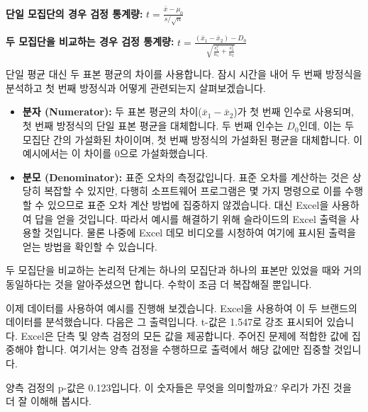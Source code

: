 \documentclass[11pt,a4paper]{article}
\begin{document}
\begin{tcolorbox}[mybox, title=두 브랜드 비교 (6/8): 3단계 - p-값 계산 (두 모집단)]
\textbf{단일 모집단의 경우 검정 통계량:}
$t = \frac{\bar{x} - \mu_0}{s/\sqrt{n}}$

\textbf{두 모집단을 비교하는 경우 검정 통계량:}
$t = \frac{(\bar{x}_1 - \bar{x}_2) - D_0}{\sqrt{\frac{s_1^2}{n_1} + \frac{s_2^2}{n_2}}}$

단일 평균 대신 두 표본 평균의 차이를 사용합니다. 잠시 시간을 내어 두 번째 방정식을 분석하고 첫 번째 방정식과 어떻게 관련되는지 살펴보겠습니다.
\begin{itemize}
    \item \textbf{분자 (Numerator):} 두 표본 평균의 차이($\bar{x}_1 - \bar{x}_2$)가 첫 번째 인수로 사용되며, 첫 번째 방정식의 단일 표본 평균을 대체합니다. 두 번째 인수는 $D_0$인데, 이는 두 모집단 간의 가설화된 차이이며, 첫 번째 방정식의 가설화된 평균을 대체합니다. 이 예시에서는 이 차이를 0으로 가설화했습니다.
    \item \textbf{분모 (Denominator):} 표준 오차의 측정값입니다. 표준 오차를 계산하는 것은 상당히 복잡할 수 있지만, 다행히 소프트웨어 프로그램은 몇 가지 명령으로 이를 수행할 수 있으므로 표준 오차 계산 방법에 집중하지 않겠습니다. 대신 Excel을 사용하여 답을 얻을 것입니다. 따라서 예시를 해결하기 위해 슬라이드의 Excel 출력을 사용할 것입니다. 물론 나중에 Excel 데모 비디오를 시청하여 여기에 표시된 출력을 얻는 방법을 확인할 수 있습니다.
\end{itemize}
두 모집단을 비교하는 논리적 단계는 하나의 모집단과 하나의 표본만 있었을 때와 거의 동일하다는 것을 알아주셨으면 합니다. 수학이 조금 더 복잡해질 뿐입니다.

이제 데이터를 사용하여 예시를 진행해 보겠습니다. Excel을 사용하여 이 두 브랜드의 데이터를 분석했습니다. 다음은 그 출력입니다. t-값은 1.547로 강조 표시되어 있습니다. Excel은 단측 및 양측 검정의 모든 값을 제공합니다. 주어진 문제에 적합한 값에 집중해야 합니다. 여기서는 양측 검정을 수행하므로 출력에서 해당 값에만 집중할 것입니다.

양측 검정의 p-값은 0.123입니다. 이 숫자들은 무엇을 의미할까요? 우리가 가진 것을 더 잘 이해해 봅시다.


\end{tcolorbox}
\end{document}

